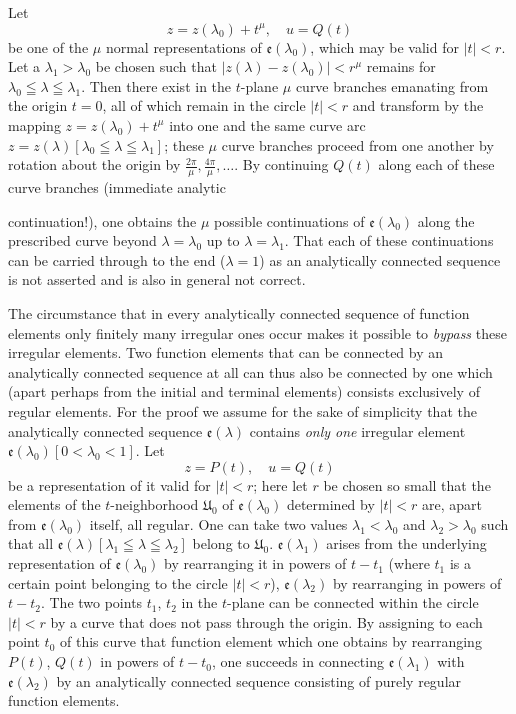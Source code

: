 \documentclass{article}
\begin{document}
Let
\[ z = z(\lambda_0) + t^\mu, \quad u = Q(t) \]
be one of the $\mu$ normal representations of $\mathfrak{e}(\lambda_0)$, which may be valid for $|t| < r$. Let a $\lambda_1 > \lambda_0$ be chosen such that $|z(\lambda) - z(\lambda_0)| < r^\mu$ remains for $\lambda_0 \leqq \lambda \leqq \lambda_1$. Then there exist in the $t$-plane $\mu$ curve branches emanating from the origin $t = 0$, all of which remain in the circle $|t| < r$ and transform by the mapping $z = z(\lambda_0) + t^\mu$ into one and the same curve arc $z = z(\lambda) [\lambda_0 \leqq \lambda \leqq \lambda_1]$; these $\mu$ curve branches proceed from one another by rotation about the origin by $\frac{2\pi}{\mu}, \frac{4\pi}{\mu}, \dots$. By continuing $Q(t)$ along each of these curve branches (immediate analytic

continuation!), one obtains the $\mu$ possible continuations of $\mathfrak{e}(\lambda_0)$ along the prescribed curve beyond $\lambda = \lambda_0$ up to $\lambda = \lambda_1$. That each of these continuations can be carried through to the end ($\lambda = 1$) as an analytically connected sequence is not asserted and is also in general not correct.

The circumstance that in every analytically connected sequence of function elements only finitely many irregular ones occur makes it possible to \emph{bypass} these irregular elements. Two function elements that can be connected by an analytically connected sequence at all can thus also be connected by one which (apart perhaps from the initial and terminal elements) consists exclusively of regular elements. For the proof we assume for the sake of simplicity that the analytically connected sequence $\mathfrak{e}(\lambda)$ contains \emph{only one} irregular element $\mathfrak{e}(\lambda_0) [0 < \lambda_0 < 1]$. Let
\[ z = P(t), \quad u = Q(t) \]
be a representation of it valid for $|t| < r$; here let $r$ be chosen so small that the elements of the $t$-neighborhood $\mathfrak{U}_0$ of $\mathfrak{e}(\lambda_0)$ determined by $|t| < r$ are, apart from $\mathfrak{e}(\lambda_0)$ itself, all regular. One can take two values $\lambda_1 < \lambda_0$ and $\lambda_2 > \lambda_0$ such that all $\mathfrak{e}(\lambda) [\lambda_1 \leqq \lambda \leqq \lambda_2]$ belong to $\mathfrak{U}_0$. $\mathfrak{e}(\lambda_1)$ arises from the underlying representation of $\mathfrak{e}(\lambda_0)$ by rearranging it in powers of $t - t_1$ (where $t_1$ is a certain point belonging to the circle $|t| < r$), $\mathfrak{e}(\lambda_2)$ by rearranging in powers of $t - t_2$. The two points $t_1$, $t_2$ in the $t$-plane can be connected within the circle $|t| < r$ by a curve that does not pass through the origin. By assigning to each point $t_0$ of this curve that function element which one obtains by rearranging $P(t)$, $Q(t)$ in powers of $t - t_0$, one succeeds in connecting $\mathfrak{e}(\lambda_1)$ with $\mathfrak{e}(\lambda_2)$ by an analytically connected sequence consisting of purely regular function elements.
\end{document}
